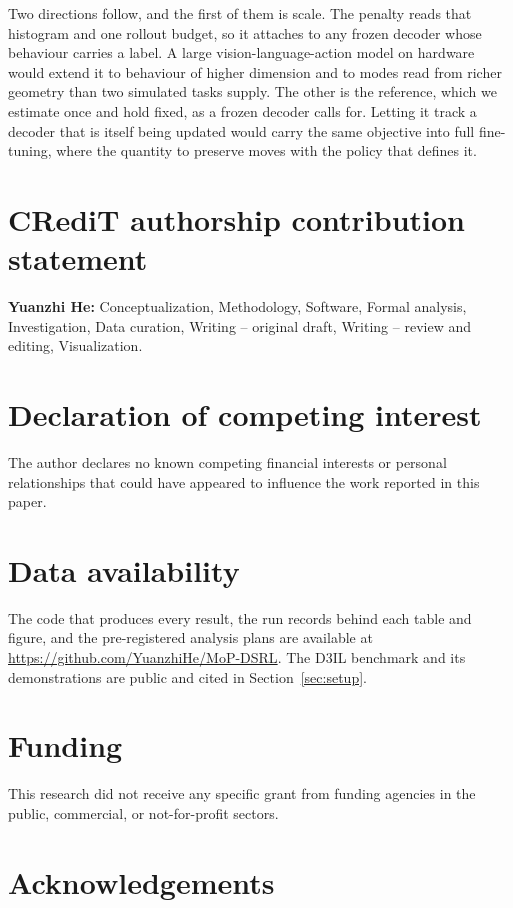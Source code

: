 \documentclass[preprint,12pt]{elsarticle}
\begin{document}
Two directions follow, and the first of them is scale. The penalty reads that
histogram and one rollout budget, so it attaches to any frozen decoder whose
behaviour carries a label. A large vision-language-action model on hardware
would extend it to behaviour of higher dimension and to modes read from richer
geometry than two simulated tasks supply. The other is the reference, which we
estimate once and hold fixed, as a frozen decoder calls for. Letting it track a
decoder that is itself being updated would carry the same objective into full
fine-tuning, where the quantity to preserve moves with the policy that defines
it.

\section*{CRediT authorship contribution statement}

\textbf{Yuanzhi He:} Conceptualization, Methodology, Software, Formal analysis,
Investigation, Data curation, Writing -- original draft, Writing -- review and
editing, Visualization.

\section*{Declaration of competing interest}

The author declares no known competing financial interests or personal
relationships that could have appeared to influence the work reported in this
paper.

\section*{Data availability}

The code that produces every result, the run records behind each table and
figure, and the pre-registered analysis plans are available at
\url{https://github.com/YuanzhiHe/MoP-DSRL}. The D3IL benchmark and its
demonstrations are public and cited in Section~\ref{sec:setup}.

\section*{Funding}

This research did not receive any specific grant from funding agencies in the
public, commercial, or not-for-profit sectors.

\section*{Acknowledgements}
\end{document}
